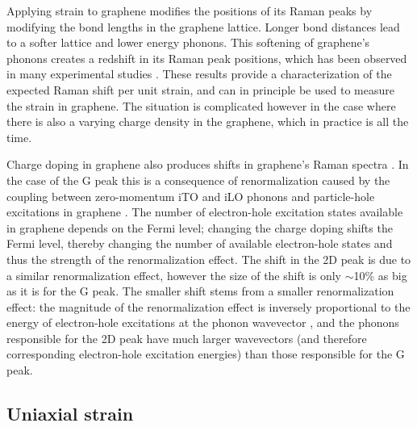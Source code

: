 \documentclass[edeposit,fullpage,draftthesis]{uiucthesis2009}
\begin{document}
        Applying strain to graphene modifies the positions of its Raman peaks by modifying the bond
        lengths in the graphene lattice. Longer bond distances lead to a softer lattice and lower
        energy phonons. This softening of graphene's phonons creates a redshift in its Raman peak positions,
        which has been observed in many experimental studies 
        \cite{mohiuddin2009uniaxial, ni2008uniaxial, huang2009phonon, huang2010probing, yoon2011strain, ding2010stretchable, metzger2009biaxial}. These results provide a characterization of the expected Raman shift per unit
        strain, and can in principle be used to measure the strain in graphene. The situation is complicated however
        in the case where there is also a varying charge density in the graphene, which in practice is all the time.
        
        Charge doping in graphene also produces shifts in graphene's Raman spectra 
        \cite{casiraghi2007raman, yan2007electric, pisana2007breakdown, lazzeri2006nonadiabatic, das2008monitoring}. 
        In the case of the G peak this
        is a consequence of renormalization caused by the coupling between zero-momentum iTO and iLO phonons and
        particle-hole excitations in graphene \cite{yan2007electric, lazzeri2006nonadiabatic, pisana2007breakdown}.
        The number of electron-hole excitation states available in graphene depends on the Fermi level;
        changing the charge doping shifts the Fermi level, thereby changing the number of available
        electron-hole states and thus the strength of the renormalization effect.
        The shift in the 2D peak is due to a similar renormalization effect, however the 
        size of the shift is only $\sim$10\% as big as it is for the G peak. 
        The smaller shift stems from a smaller renormalization effect:
        the magnitude of the renormalization effect is inversely proportional to the energy of electron-hole
        excitations at the phonon wavevector \cite{yan2007electric}, and the phonons responsible for the 2D peak have much larger
        wavevectors (and therefore corresponding electron-hole excitation energies)
        than those responsible for the G peak.
        
        \subsection{Uniaxial strain}
                    
\end{document}
